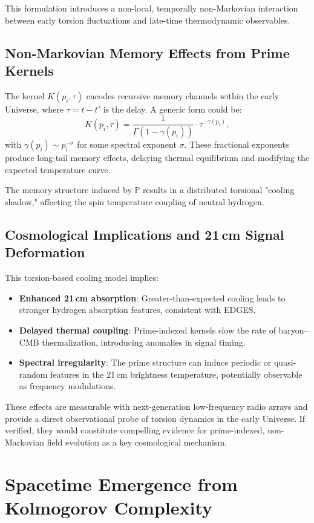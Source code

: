 \documentclass{article}
\theoremstyle{plain}
\begin{document}
This formulation introduces a non-local, temporally non-Markovian interaction between early torsion fluctuations and late-time thermodynamic observables.

\subsection{Non-Markovian Memory Effects from Prime Kernels}

The kernel $K(p_i, \tau)$ encodes recursive memory channels within the early Universe, where $\tau = t - t'$ is the delay. A generic form could be:
\[
K(p_i, \tau) = \frac{1}{\Gamma(1 - \gamma(p_i))} \cdot \tau^{-\gamma(p_i)},
\]
with $\gamma(p_i) \sim p_i^{-\sigma}$ for some spectral exponent $\sigma$. These fractional exponents produce long-tail memory effects, delaying thermal equilibrium and modifying the expected temperature curve.

The memory structure induced by $\mathbb{P}$ results in a distributed torsional "cooling shadow," affecting the spin temperature coupling of neutral hydrogen.

\subsection{Cosmological Implications and 21 cm Signal Deformation}

This torsion-based cooling model implies:
\begin{itemize}
    \item \textbf{Enhanced 21 cm absorption}: Greater-than-expected cooling leads to stronger hydrogen absorption features, consistent with EDGES.
    \item \textbf{Delayed thermal coupling}: Prime-indexed kernels slow the rate of baryon–CMB thermalization, introducing anomalies in signal timing.
    \item \textbf{Spectral irregularity}: The prime structure can induce periodic or quasi-random features in the 21 cm brightness temperature, potentially observable as frequency modulations.
\end{itemize}

These effects are measurable with next-generation low-frequency radio arrays and provide a direct observational probe of torsion dynamics in the early Universe. If verified, they would constitute compelling evidence for prime-indexed, non-Markovian field evolution as a key cosmological mechanism.

\section{Spacetime Emergence from Kolmogorov Complexity}
\end{document}
